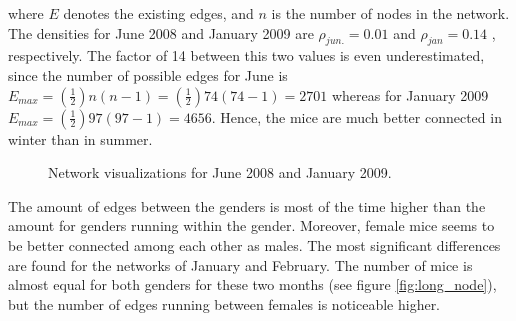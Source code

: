 where $E$ denotes the existing edges, and $n$ is the number of nodes in the network. The densities for June 2008 and January 2009 are $\rho_{jun.} = 0.01$ and $\rho_{jan} = 0.14$ , respectively. The factor of 14 between this two values is even underestimated, since the number of possible edges for June is $E_{max} = (\frac{1}{2})n(n-1) = (\frac{1}{2}) 74(74 -1) = 2701$ whereas for January 2009 $E_{max} = (\frac{1}{2}) 97(97-1)  = 4656$. Hence, the mice are much better connected in winter than in summer.  

\begin{figure}[htpb]%
	\centering 
	
	\qquad 			
	\caption[Network visualizations for June 2008 and January 2009]{Network visualizations for June 2008 and January 2009.}
	 \label{fig:june_jan_side}
\end{figure} 

The amount of edges between the genders is most of the time higher than the amount for genders running within the gender. Moreover, female mice seems to be better connected among each other as males. The most significant differences are found for the networks of January and February. The number of mice is almost equal for both genders for these two months (see figure \ref{fig:long_node}), but the number of edges running between females is noticeable higher. 
      
